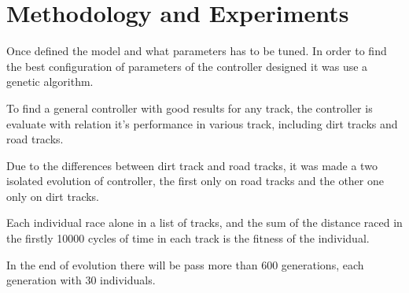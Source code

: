 \section{Methodology and Experiments} \label{sec:exp}
	Once defined the model and what parameters has to be tuned. In order to find the best configuration of parameters of the controller designed it was use a genetic algorithm.
	
	To find a general controller with good results for any track, the controller is evaluate with relation it's performance in various track, including dirt tracks and road tracks. 
	
	Due to the differences between dirt track and road tracks, it was made a two isolated evolution of controller, the first only on road tracks and the other one only on dirt tracks.
	
	Each individual race alone in a list of tracks, and the sum of the distance raced in the firstly 10000 cycles of time in each track is the fitness of the individual.
	
	In the end of evolution there will be pass more than 600 generations, each generation with 30 individuals.
	